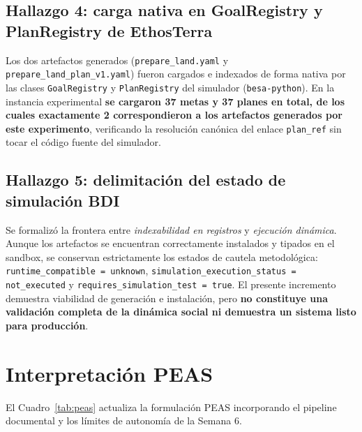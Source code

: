 \documentclass[11pt,a4paper]{article}
\begin{document}
\subsection{Hallazgo 4: carga nativa en GoalRegistry y PlanRegistry de EthosTerra}
Los dos artefactos generados (\texttt{prepare\_land.yaml} y \texttt{prepare\_land\_plan\_v1.yaml}) fueron cargados e indexados de forma nativa por las clases \texttt{GoalRegistry} y \texttt{PlanRegistry} del simulador (\texttt{besa-python}). En la instancia experimental \textbf{se cargaron 37 metas y 37 planes en total, de los cuales exactamente 2 correspondieron a los artefactos generados por este experimento}, verificando la resolución canónica del enlace \texttt{plan\_ref} sin tocar el código fuente del simulador.

\subsection{Hallazgo 5: delimitación del estado de simulación BDI}
Se formalizó la frontera entre \textit{indexabilidad en registros} y \textit{ejecución dinámica}. Aunque los artefactos se encuentran correctamente instalados y tipados en el sandbox, se conservan estrictamente los estados de cautela metodológica: \texttt{runtime\_compatible = unknown}, \texttt{simulation\_execution\_status = not\_executed} y \texttt{requires\_simulation\_test = true}. El presente incremento demuestra viabilidad de generación e instalación, pero \textbf{no constituye una validación completa de la dinámica social ni demuestra un sistema listo para producción}.

\section{Interpretación PEAS}
El Cuadro~\ref{tab:peas} actualiza la formulación PEAS incorporando el pipeline documental y los límites de autonomía de la Semana 6.
\end{document}
